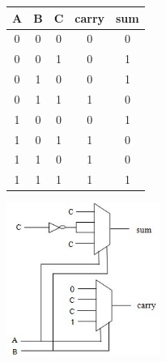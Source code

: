 \documentclass[a4paper]{article}
\begin{document}
\begin{latin}
\begin{center}
\begin{tabular}{c|c|c||c|c}
A & B & C & carry & sum \\
\hline
\hline
0 & 0 & 0 & 0 & 0 \\
\hline
0 & 0 & 1 & 0 & 1 \\
\hline
0 & 1 & 0 & 0 & 1 \\
\hline
0 & 1 & 1 & 1 & 0 \\
\hline
1 & 0 & 0 & 0 & 1 \\
\hline
1 & 0 & 1 & 1 & 0 \\
\hline
1 & 1 & 0 & 1 & 0 \\
\hline
1 & 1 & 1 & 1 & 1 \\
\hline
\end{tabular}
\end{center}
\end{latin}

\begin{center}
\includegraphics[width=5cm]{images/mux-sol.jpg}
\end{center}
\end{document}
